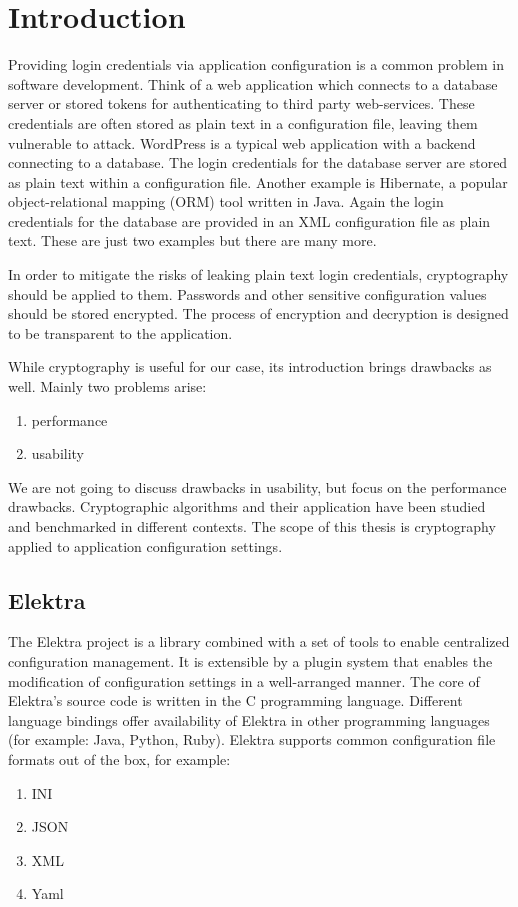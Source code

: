 \chapter{Introduction}

Providing login credentials via application configuration is a common problem in software development.
Think of a web application which connects to a database server or stored tokens for authenticating to third party web-services.
These credentials are often stored as plain text in a configuration file, leaving them vulnerable to attack.
WordPress is a typical web application with a backend connecting to a database.
The login credentials for the database server are stored as plain text within a configuration file.\cite{wordpress-doc}
Another example is Hibernate, a popular object-relational mapping (ORM) tool written in Java.
Again the login credentials for the database are provided in an XML configuration file as plain text.\cite{hibernate-doc}
These are just two examples but there are many more.

In order to mitigate the risks of leaking plain text login credentials, cryptography should be applied to them.
Passwords and other sensitive configuration values should be stored encrypted.
The process of encryption and decryption is designed to be transparent to the application.

While cryptography is useful for our case, its introduction brings drawbacks as well.
Mainly two problems arise:
\begin{enumerate}
\item performance
\item usability
\end{enumerate}

We are not going to discuss drawbacks in usability, but focus on the performance drawbacks.
Cryptographic algorithms and their application have been studied and benchmarked in different contexts.\cite{thakur2011aes,ocf,freebsdtls}
The scope of this thesis is cryptography applied to application configuration settings.

\section{Elektra}

The Elektra project is a library combined with a set of tools to enable centralized configuration management.
It is extensible by a plugin system that enables the modification of configuration settings in a well-arranged manner.
The core of Elektra's source code is written in the C programming language.
Different language bindings offer availability of Elektra in other programming languages (for example: Java, Python, Ruby).
Elektra supports common configuration file formats out of the box, for example:\cite{raab2010thesis,elektra-doc}
\begin{enumerate}
\item INI
\item JSON
\item XML
\item Yaml
\end{enumerate}

